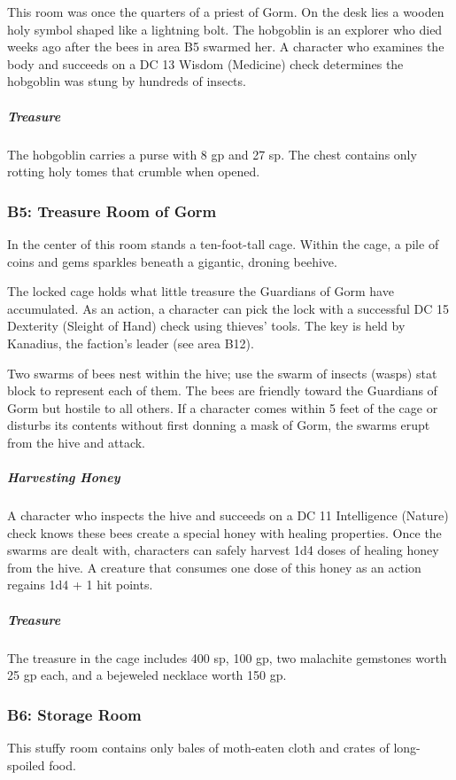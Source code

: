 \documentclass[10pt,a4paper,twoside,bg=print,twocolumn,openany,nodeprecatedcode]{dndbook}
\begin{document}
This room was once the quarters of a priest of Gorm. On the desk lies a wooden holy symbol shaped like a lightning bolt. The hobgoblin is an explorer who died weeks ago after the bees in area B5 swarmed her. A character who examines the body and succeeds on a DC 13 Wisdom (Medicine) check determines the hobgoblin was stung by hundreds of insects.

\subparagraph{Treasure}
The hobgoblin carries a purse with 8 gp and 27 sp. The chest contains only rotting holy tomes that crumble when opened.

\subsubsection{B5: Treasure Room of Gorm}
\begin{DndReadAloud}{}
In the center of this room stands a ten-foot-tall cage. Within the cage, a pile of coins and gems sparkles beneath a gigantic, droning beehive.

\end{DndReadAloud}

The locked cage holds what little treasure the Guardians of Gorm have accumulated. As an action, a character can pick the lock with a successful DC 15 Dexterity (Sleight of Hand) check using thieves' tools. The key is held by Kanadius, the faction's leader (see area B12).

Two swarms of bees nest within the hive; use the swarm of insects (wasps) stat block to represent each of them. The bees are friendly toward the Guardians of Gorm but hostile to all others. If a character comes within 5 feet of the cage or disturbs its contents without first donning a mask of Gorm, the swarms erupt from the hive and attack.

\subparagraph{Harvesting Honey}
A character who inspects the hive and succeeds on a DC 11 Intelligence (Nature) check knows these bees create a special honey with healing properties. Once the swarms are dealt with, characters can safely harvest 1d4 doses of healing honey from the hive. A creature that consumes one dose of this honey as an action regains 1d4 + 1 hit points.

\subparagraph{Treasure}
The treasure in the cage includes 400 sp, 100 gp, two malachite gemstones worth 25 gp each, and a bejeweled necklace worth 150 gp.

\subsubsection{B6: Storage Room}
\begin{DndReadAloud}{}
This stuffy room contains only bales of moth-eaten cloth and crates of long-spoiled food.

\end{DndReadAloud}
\end{document}
